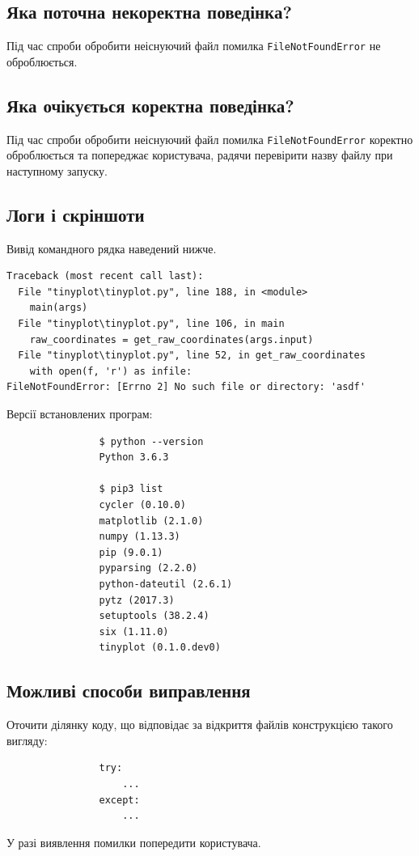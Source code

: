 \documentclass[a4paper,oneside,DIV=12,12pt]{scrartcl}
\begin{document}
		\subsection{Яка поточна некоректна поведінка?}
			Під час спроби обробити неіснуючий файл помилка \verb|FileNotFoundError| не оброблюється.
			
		\subsection{Яка очікується коректна поведінка?}
			Під час спроби обробити неіснуючий файл помилка \verb|FileNotFoundError| коректно оброблюється та попереджає користувача, радячи перевірити назву файлу при наступному запуску.
			
		\subsection{Логи і скріншоти}
			Вивід командного рядка наведений нижче.
			\begin{lstlisting}
Traceback (most recent call last):
  File "tinyplot\tinyplot.py", line 188, in <module>
    main(args)
  File "tinyplot\tinyplot.py", line 106, in main
    raw_coordinates = get_raw_coordinates(args.input)
  File "tinyplot\tinyplot.py", line 52, in get_raw_coordinates
    with open(f, 'r') as infile:
FileNotFoundError: [Errno 2] No such file or directory: 'asdf'
			\end{lstlisting}
			
			Версії встановлених програм:
			\begin{lstlisting}
				$ python --version
				Python 3.6.3

				$ pip3 list
				cycler (0.10.0)
				matplotlib (2.1.0)
				numpy (1.13.3)
				pip (9.0.1)
				pyparsing (2.2.0)
				python-dateutil (2.6.1)
				pytz (2017.3)
				setuptools (38.2.4)
				six (1.11.0)
				tinyplot (0.1.0.dev0)
			\end{lstlisting}
			
		\subsection{Можливі способи виправлення}
			Оточити ділянку коду, що відповідає за відкриття файлів конструкцією такого вигляду:
			\begin{lstlisting}
				try:
					...
				except:
					...
			\end{lstlisting}
			
			У разі виявлення помилки попередити користувача.
			
\end{document}
